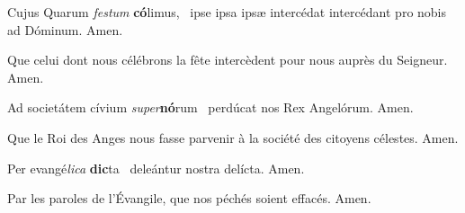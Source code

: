 \documentclass[psautier_nocturne_fr.tex]{subfiles}
\begin{document}

\begin{paracol}{2}

Cujus  Quarum\rubric{)} \textit{festum} \textbf{có}limus,~\GreSpecial{*}
ipse  ipsa  ipsæ\rubric{)}
intercédat  intercédant\rubric{)} pro nobis ad Dóminum.
\hspace{\specialcharhsep}\rr Amen.

\switchcolumn

Que celui  dont nous célébrons la fête intercède\rubric{(}nt\rubric{)} pour nous auprès du Seigneur.
\hspace{\specialcharhsep}\rr Amen.

\end{paracol}

\begin{paracol}{2}

Ad societátem cívium \textit{super}\textbf{nó}rum~\GreSpecial{*}
perdúcat nos Rex Angelórum.
\hspace{\specialcharhsep}\rr Amen.

\switchcolumn

Que le Roi des Anges nous fasse parvenir à la société des citoyens célestes.
\hspace{\specialcharhsep}\rr Amen.

\end{paracol}


\begin{paracol}{2}

Per evangé\textit{lica} \textbf{dic}ta~\GreSpecial{*}
deleántur nostra delícta.
\hspace{\specialcharhsep}\rr Amen.

\switchcolumn

Par les paroles de l'Évangile, que nos péchés soient effacés.
\hspace{\specialcharhsep}\rr Amen.

\end{paracol}


\end{document}
